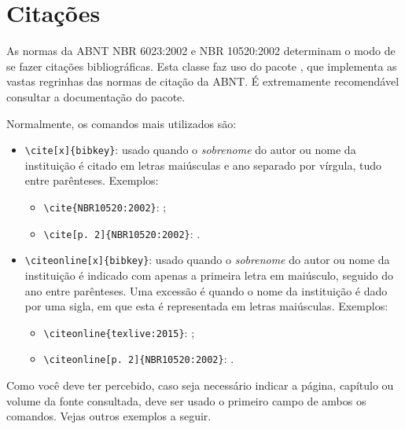 \section{Citações}

As normas da ABNT NBR 6023:2002 e NBR 10520:2002 determinam o modo de se fazer citações bibliográficas. Esta classe faz uso do pacote , que implementa as vastas regrinhas das normas de citação da ABNT. É extremamente recomendável consultar a documentação do pacote.

Normalmente, os comandos mais utilizados são:

\begin{itemize}
\item  \Verb+\cite[x]{bibkey}+: usado quando o \emph{sobrenome} do autor ou nome da instituição é citado em letras maiúsculas e ano separado por vírgula, tudo entre parênteses. Exemplos:

\begin{itemize}
\item \Verb+\cite{NBR10520:2002}+: \cite{NBR10520:2002};
\item \Verb+\cite[p. 2]{NBR10520:2002}+: \cite[p. 2]{NBR10520:2002}.
\end{itemize}

\item  \Verb+\citeonline[x]{bibkey}+: usado quando o \emph{sobrenome} do autor ou nome da instituição é indicado com apenas a primeira letra em maiúsculo, seguido do ano entre parênteses. Uma excessão é quando o nome da instituição é dado por uma sigla, em que esta é representada em letras maiúsculas. Exemplos: 

\begin{itemize}
\item \Verb+\citeonline{texlive:2015}+: ;
\item \Verb+\citeonline[p. 2]{NBR10520:2002}+: .
\end{itemize}

\end{itemize}

Como você deve ter percebido, caso seja necessário indicar a página, capítulo ou volume da fonte consultada, deve ser usado o primeiro campo de ambos os comandos. Vejas outros exemplos a seguir.

